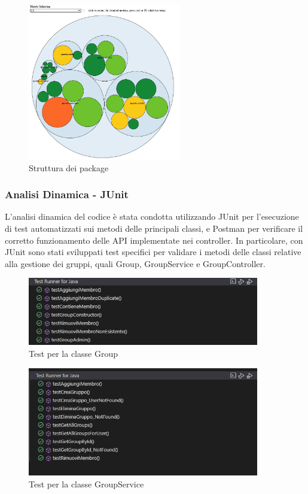 \begin{figure}[H]
    \centering
    \includegraphics[width=0.6\textwidth]{images/CodeMR_graph2.png}
    \caption{Struttura dei package}
    \label{fig:Package_iterazione1}
\end{figure}


\subsubsection{Analisi Dinamica - JUnit}

L'analisi dinamica del codice è stata condotta utilizzando JUnit per l'esecuzione di test automatizzati sui metodi delle principali classi, e Postman per verificare il corretto funzionamento delle API implementate nei controller.
In particolare, con JUnit sono stati sviluppati test specifici per validare i metodi delle classi relative alla gestione dei gruppi, quali Group, GroupService e GroupController.

\begin{figure}[H]
    \centering
    \includegraphics[width=0.9\textwidth]{images/TestGroup.png}
    \caption{Test per la classe Group}
    \label{fig:Group_test}
\end{figure}

\begin{figure}[H]
    \centering
    \includegraphics[width=0.9\textwidth]{images/TestGroupService.png}
    \caption{Test per la classe GroupService}
    \label{fig:GroupService_test}
\end{figure}

